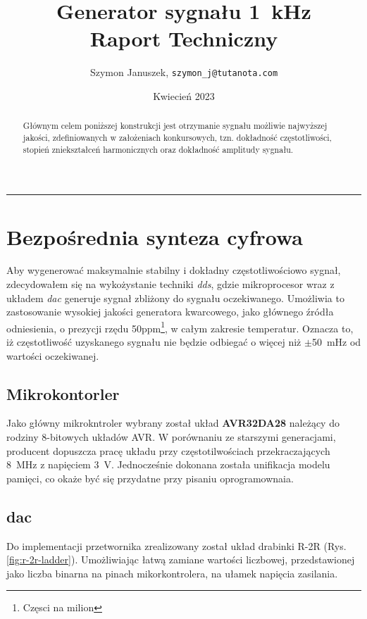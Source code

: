 \documentclass[12pt, a4paper]{article}
\title{
	Generator sygnału \qty{1}{\kHz}\\
	\large Raport Techniczny
}
\author{Szymon Januszek, \texttt{szymon\_j@tutanota.com}}
\date{Kwiecień 2023}
\begin{document}
\maketitle
\hrule

\begin{abstract}
	Głównym celem poniższej konstrukcji jest otrzymanie sygnału możliwie najwyższej jakości, 
	zdefiniowanych w założeniach konkursowych, tzn. dokładność częstotliwości, stopień zniekształceń harmonicznych 
	oraz dokładność amplitudy sygnału.
\end{abstract}


\newpage

\tableofcontents

\newpage

\section[DDS]{Bezpośrednia synteza cyfrowa}

Aby wygenerować maksymalnie stabilny i dokładny częstotliwościowo sygnał, 
zdecydowałem się na wykożystanie techniki \textit{\Ac{dds}}, 
gdzie mikroprocesor wraz z układem \textit{\Ac{dac}} generuje sygnał zbliżony do sygnału oczekiwanego. 
Umożliwia to zastosowanie wysokiej jakości generatora kwarcowego, 
jako głównego źródła odniesienia, o prezycji rzędu 50ppm\footnote{Częsci na milion}, 
w całym zakresie temperatur. Oznacza to, iż częstotliwość uzyskanego sygnału nie będzie odbiegać o więcej niż $\pm$\qty{50}{\mHz} od wartości oczekiwanej. 

\subsection{Mikrokontorler}
Jako główny mikrokntroler wybrany został układ \textbf{AVR32DA28}\cite{avr-datasheet} należący do \\rodziny 8-bitowych układów AVR.
W porównaniu ze starszymi generacjami, producent dopuszcza pracę układu przy częstotilwościach przekraczających \qty{8}{\MHz} z napięciem \qty{3}{\volt}.
Jednocześnie dokonana została unifikacja modelu pamięci, co okaże być się przydatne przy pisaniu oprogramownaia.

\subsection{\Ac{dac}}
Do implementacji przetwornika zrealizowany został układ drabinki R-2R (Rys.\ref{fig:r-2r-ladder}).
Umożliwiając łatwą zamiane wartości liczbowej, przedstawionej jako liczba binarna na pinach mikorkontrolera, 
na ułamek napięcia zasilania.
\end{document}
